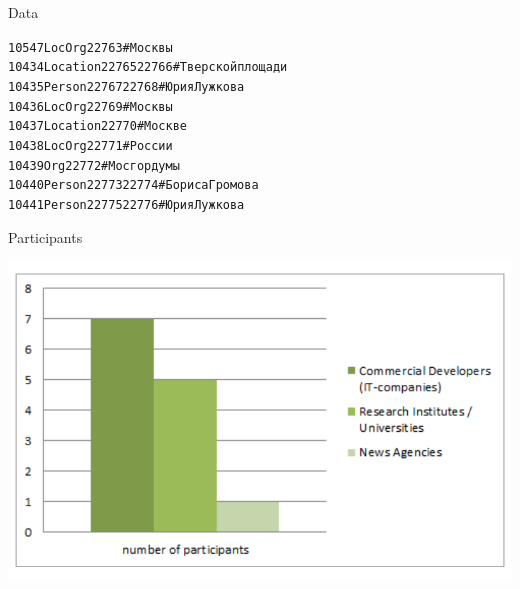 \documentclass[10pt, compress]{beamer}
\begin{document}
\begin{frame}{Data}
\begin{onlyenv}
{\begin{alltt}
10547 LocOrg 22763 \# Москвы \\
10434 Location 22765 22766 \# Тверской площади \\
10435 Person 22767 22768 \# Юрия Лужкова \\
10436 LocOrg 22769 \# Москвы \\
10437 Location 22770 \# Москве \\
10438 LocOrg 22771 \# России \\
10439 Org 22772 \# Мосгордумы \\
10440 Person 22773 22774 \# Бориса Громова \\
10441 Person 22775 22776 \# Юрия Лужкова \\
\end{alltt}
}
\end{onlyenv}



\end{frame}


\begin{frame}{Participants}

\begin{center}
\includegraphics[width=\textwidth]{graphics/factrueval-participants.png}
\end{center}

\end{frame}
\end{document}

